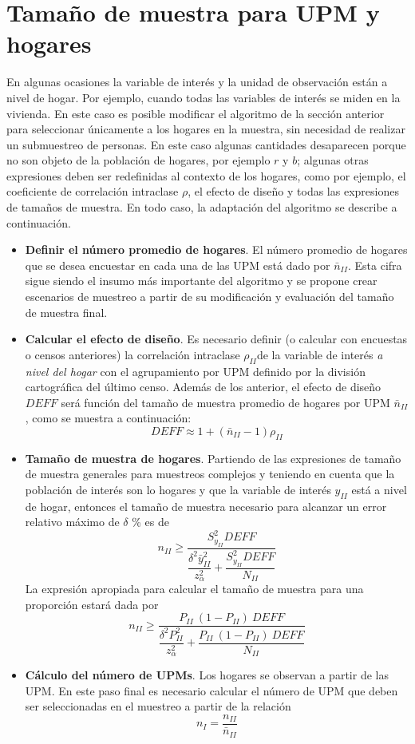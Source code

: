 \documentclass[
  12pt,
  spanish,
]{book}
\begin{document}
\hypertarget{tamauxf1o-de-muestra-para-upm-y-hogares}{%
\section{Tamaño de muestra para UPM y hogares}\label{tamauxf1o-de-muestra-para-upm-y-hogares}}

En algunas ocasiones la variable de interés y la unidad de observación están a nivel de hogar. Por ejemplo, cuando todas las variables de interés se miden en la vivienda. En este caso es posible modificar el algoritmo de la sección anterior para seleccionar únicamente a los hogares en la muestra, sin necesidad de realizar un submuestreo de personas. En este caso algunas cantidades desaparecen porque no son objeto de la población de hogares, por ejemplo \(r\) y \(b\); algunas otras expresiones deben ser redefinidas al contexto de los hogares, como por ejemplo, el coeficiente de correlación intraclase \(\rho\), el efecto de diseño y todas las expresiones de tamaños de muestra. En todo caso, la adaptación del algoritmo se describe a continuación.

\begin{itemize}
\item
  \textbf{Definir el número promedio de hogares}. El número promedio de hogares que se desea encuestar en cada una de las UPM está dado por \(\bar{n}_{II}\). Esta cifra sigue siendo el insumo más importante del algoritmo y se propone crear escenarios de muestreo a partir de su modificación y evaluación del tamaño de muestra final.
\item
  \textbf{Calcular el efecto de diseño}. Es necesario definir (o calcular con encuestas o censos anteriores) la correlación intraclase \(\rho_{II}\)de la variable de interés \emph{a nivel del hogar} con el agrupamiento por UPM definido por la división cartográfica del último censo. Además de los anterior, el efecto de diseño \(DEFF\) será función del tamaño de muestra promedio de hogares por UPM \(\bar{n}_{II}\), como se muestra a continuación:
  \[
  DEFF \approx 1 + (\bar{n}_{II} - 1)\rho_{II}
  \]
\item
  \textbf{Tamaño de muestra de hogares}. Partiendo de las expresiones de tamaño de muestra generales para muestreos complejos y teniendo en cuenta que la población de interés son lo hogares y que la variable de interés \(y_{II}\) está a nivel de hogar, entonces el tamaño de muestra necesario para alcanzar un error relativo máximo de \(\delta\) \% es de
  \[
  n_{II} \geq \dfrac{S^2_{y_{II}}DEFF}{\dfrac{\delta^2 \bar{y}_{II}^2}{z_{\alpha}^2}+\dfrac{S^2_{y_{II}}DEFF}{N_{II}}}
  \]
  La expresión apropiada para calcular el tamaño de muestra para una proporción estará dada por
  \[
  n_{II} \geq \dfrac{P_{II}\ (1-P_{II})\ DEFF}{\dfrac{\delta^2P^2_{II}}{z_{\alpha}^2 }+\dfrac{P_{II}\ (1-P_{II}) \ DEFF}{N_{II}}}
  \]
\item
  \textbf{Cálculo del número de UPMs}. Los hogares se observan a partir de las UPM. En este paso final es necesario calcular el número de UPM que deben ser seleccionadas en el muestreo a partir de la relación
  \[
  n_{I} = \frac{n_{II}}{\bar{n}_{II}}
  \]
\end{itemize}
\end{document}

